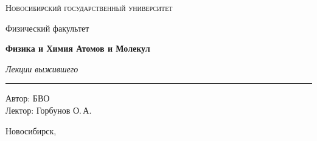 \documentclass[12pt,a4paper]{report}
\begin{document}
\hypersetup{pageanchor=false}
\begin{titlepage}
    \thispagestyle{empty}

    \begin{center}
        \vspace*{1.5cm}

        {\Large\scshape Новосибирский государственный университет\par}
        \vspace{0.25cm}
        {\large Физический факультет\par}

        \vfill

        {\Huge\bfseries Физика и Химия Атомов и Молекул\par}

        \vspace{0.45cm}

        {\Large\itshape Лекции выжившего\par}

        \vspace{0.8cm}

        \rule{0.72\linewidth}{0 pt}





        \vfill

        \begin{flushright}
            \large
            Автор: БВО\\[0.25cm]
            Лектор: Горбунов О.\,А.
        \end{flushright}

        \vspace{1.2cm}

        {\large Новосибирск, \the\year}

    \end{center}
\end{titlepage}
\hypersetup{pageanchor=true}

\tableofcontents
\newpage



\clearpage

\clearpage

\clearpage

\clearpage
\end{document}
